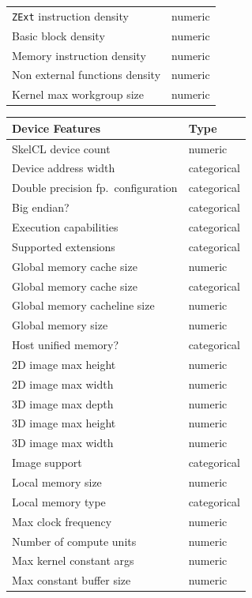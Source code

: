 \begin{table}
\begin{multicols}{2}
\begin{tabular}{p{4.5cm}p{1.3cm}}
    \texttt{ZExt} instruction density &      numeric \\
    Basic block density & numeric \\
    Memory instruction density & numeric \\
    Non external functions density &      numeric \\
    Kernel max workgroup size &      numeric \\
    \bottomrule
  \end{tabular}
  \vfill
  \columnbreak
  \begin{tabular}{p{4.5cm}p{1.3cm}}
    \toprule
    \textbf{Device Features} &         \textbf{Type} \\
    \midrule
    SkelCL device count &      numeric \\
    Device address width &  categorical \\
    Double precision fp.\ configuration &  categorical \\
    Big endian? &  categorical \\
    Execution capabilities &  categorical \\
    Supported extensions &  categorical \\
    Global memory cache size &  numeric \\
    Global memory cache size &      categorical \\
    Global memory cacheline size &      numeric \\
    Global memory size &  numeric \\
    Host unified memory? &      categorical \\
    2D image max height &      numeric \\
    2D image max width &      numeric \\
    3D image max depth &      numeric \\
    3D image max height &      numeric \\
    3D image max width &  numeric \\
    Image support &      categorical \\
    Local memory size &  numeric \\
    Local memory type &      categorical \\
    Max clock frequency &      numeric \\
    Number of compute units &      numeric \\
    Max kernel constant args &      numeric \\
    Max constant buffer size &      numeric \\

\end{tabular}
\end{multicols}
\end{table}
